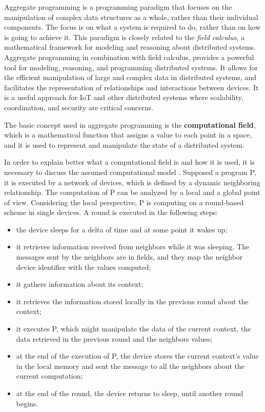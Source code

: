 Aggregate programming is a programming paradigm that focuses on the manipulation of complex data structures as a whole, rather than their individual components. The focus is on what a system is required to do, rather than on how is going to achieve it.\newline
This paradigm is closely related to the \textit{field calculus}, a mathematical framework for modeling and reasoning about distributed systems.\newline
Aggregate programming in combination with field calculus, provides a powerful tool for modeling, reasoning, and programming distributed systems. It allows for the efficient manipulation of large and complex data in distributed systems, and facilitates the representation of relationships and interactions between devices. It is a useful approach for IoT and other distributed systems where scalability, coordination, and security are critical concerns.

The basic concept used in aggregate programming is the \textbf{computational field}, which is a mathematical function that assigns a value to each point in a space, and it is used to represent and manipulate the state of a distributed system.

In order to explain better what a computational field is and how it is used, it is necessary to discuss the assumed computational model \cite{computational_fields_theory}.
Supposed a program P, it is executed by a network of devices, which is defined by a dynamic neighboring relationship. The computation of P can be analyzed by a local and a global point of view.
Considering the local perspective, P is computing on a round-based scheme in single devices. A round is executed in the following steps:
\begin{itemize}
    \item the device sleeps for a delta of time and at some point it wakes up;
    \item it retrieves information received from neighbors while it was sleeping. The messages sent by the neighbors are in fields, and they map the neighbor device identifier with the values computed;
    \item it gathers information about its context;
    \item it retrieves the information stored locally in the previous round about the context;
    \item it executes P, which might manipulate the data of the current context, the data retrieved in the previous round and the neighbors values;
    \item at the end of the execution of P, the device stores the current context's value in the local memory and sent the message to all the neighbors about the current computation;
    \item at the end of the round, the device returns to sleep, until another round begins.
\end{itemize}

